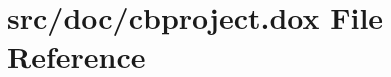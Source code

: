 \hypertarget{cbproject_8dox}{\section{src/doc/cbproject.dox File Reference}
\label{cbproject_8dox}
}
